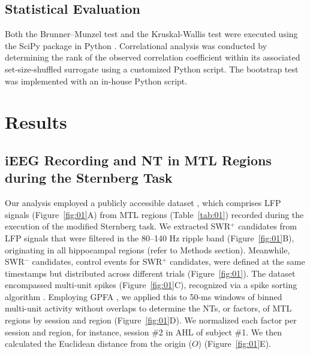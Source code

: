\documentclass[preprint,review,12pt]{elsarticle}%
\begin{document}
\subsection{Statistical Evaluation}
Both the Brunner--Munzel test and the Kruskal-Wallis test were executed using the SciPy package in Python \cite{virtanen_scipy_2020}. Correlational analysis was conducted by determining the rank of the observed correlation coefficient within its associated set-size-shuffled surrogate using a customized Python script. The bootstrap test was implemented with an in-house Python script.
\label{sec:methods}
\section{Results}
\subsection{iEEG Recording and NT in MTL Regions during the Sternberg Task}
Our analysis employed a publicly accessible dataset \cite{boran_dataset_2020}, which comprises LFP signals (Figure~\ref{fig:01}A) from MTL regions (Table~\ref{tab:01}) recorded during the execution of the modified Sternberg task. We extracted SWR$^+$ candidates from LFP signals that were filtered in the 80--140 Hz ripple band (Figure~\ref{fig:01}B), originating in all hippocampal regions (refer to Methods section). Meanwhile, SWR$^-$ candidates, control events for SWR$^+$ candidates, were defined at the same timestamps but distributed across different trials (Figure~\ref{fig:01}). The dataset encompassed multi-unit spikes (Figure~\ref{fig:01}C), recognized via a spike sorting algorithm \cite{niediek_reliable_2016}. Employing GPFA \cite{yu_gaussian-process_2009}, we applied this to 50-ms windows of binned multi-unit activity without overlaps to determine the NTs, or factors, of MTL regions by session and region (Figure~\ref{fig:01}D). We normalized each factor per session and region, for instance, session \#2 in AHL of subject \#1. We then calculated the Euclidean distance from the origin ($O$) (Figure~\ref{fig:01}E).
\end{document}

